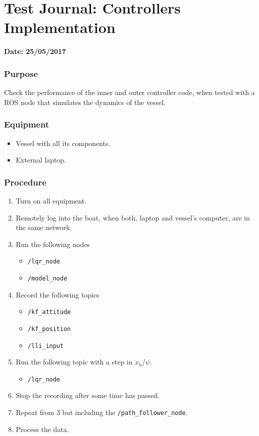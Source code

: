 \chapter{Test Journal: Controllers Implementation} \label{app:ModelNode}

\textbf{Date: 25/05/2017}

\subsection*{Purpose}
Check the performance of the inner and outer controller code, when tested with a ROS node that simulates the dynamics of the vessel.

\subsection*{Equipment}
\begin{itemize}
    \item Vessel with all its components. 
    \item External laptop.
\end{itemize}

\subsection*{Procedure}
\begin{enumerate}
    \item Turn on all equipment.
    \item Remotely log into the boat, when both, laptop and vessel's computer, are in the same network.
    \item Run the following nodes
    \begin{itemize}
        \item \lstinline[style=cinline]{/lqr_node}  
        \item \lstinline[style=cinline]{/model_node}
    \end{itemize}
    \item Record the following topics
    \begin{itemize}
        \item \lstinline[style=cinline]{/kf_attitude}
        \item \lstinline[style=cinline]{/kf_position}   
        \item \lstinline[style=cinline]{/lli_input}  
    \end{itemize}
    \item Run the following topic with a step in $\dot{x}_\mathrm{b}$/$\psi$.
    \begin{itemize}
        \item \lstinline[style=cinline]{/lqr_node}
    \end{itemize}
    \item Stop the recording after some time has passed.
    \item Repeat from 3 but including the \lstinline[style=cinline]{/path_follower_node}.
    \item Process the data.
\end{enumerate}

